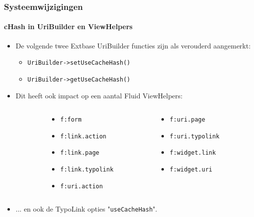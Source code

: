 \begin{frame}[fragile]
	\frametitle{Systeemwijzigingen}
	\framesubtitle{cHash in UriBuilder en ViewHelpers}

	\lstset{basicstyle=\smaller\ttfamily}

	\begin{itemize}
		\item De volgende twee Extbase UriBuilder functies zijn als verouderd aangemerkt:

			\begin{itemize}
				\item \texttt{UriBuilder->setUseCacheHash()}
				\item \texttt{UriBuilder->getUseCacheHash()}
			\end{itemize}

		\item Dit heeft ook impact op een aantal Fluid ViewHelpers:
	\end{itemize}
	\begin{columns}[T]
		\begin{column}{.05\textwidth}
		\end{column}
		\begin{column}{.45\textwidth}
			\begin{itemize}\smaller
				\item \texttt{f:form}
				\item \texttt{f:link.action}
				\item \texttt{f:link.page}
				\item \texttt{f:link.typolink}
				\item \texttt{f:uri.action}
			\end{itemize}\normalsize
		\end{column}
		\begin{column}{.45\textwidth}
			\begin{itemize}\smaller
				\item \texttt{f:uri.page}
				\item \texttt{f:uri.typolink}
				\item \texttt{f:widget.link}
				\item \texttt{f:widget.uri}
			\end{itemize}\normalsize
		\end{column}
	\end{columns}
	\vspace{0.2cm}
	\begin{itemize}
		\item ... en ook de TypoLink opties "\texttt{useCacheHash}".
	\end{itemize}

\end{frame}


